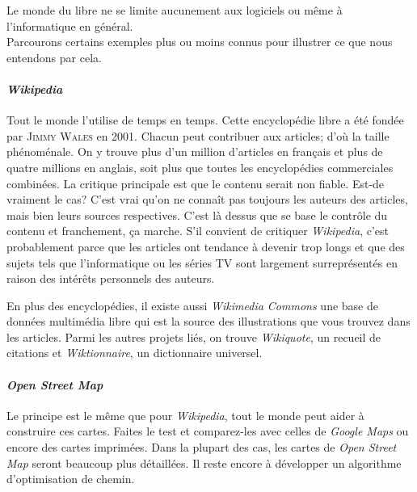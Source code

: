 




\vspace{.6cm}
Le monde du libre ne se limite aucunement aux logiciels ou même à l'informatique en général.\\
Parcourons certains exemples plus ou moins connus pour illustrer ce que nous entendons par cela.

\paragraph{\textit{Wikipedia}}
Tout le monde l'utilise de temps en temps. Cette encyclopédie libre a été fondée par \textsc{Jimmy Wales} en 2001.
Chacun peut contribuer aux articles; d'où la taille phénoménale.
On y trouve plus d'un million d'articles en français et plus de quatre millions en anglais, soit plus que toutes les encyclopédies commerciales combinées.
La critique principale est que le contenu serait non fiable.
Est-de vraiment le cas? C'est vrai qu'on ne connaît pas toujours les auteurs des articles, mais bien leurs sources respectives.
C'est là dessus que se base le contrôle du contenu et franchement, ça marche.
S'il convient de critiquer \textit{Wikipedia}, c'est probablement parce que les articles ont tendance à devenir trop longs et que des sujets tels que l'informatique ou les séries TV
sont largement surreprésentés en raison des intérêts personnels des auteurs.

En plus des encyclopédies, il existe aussi \textit{Wikimedia Commons} une base de données multimédia libre
qui est la source des illustrations que vous trouvez dans les articles.
Parmi les autres projets liés, on trouve \textit{Wikiquote}, un recueil de citations et \textit{Wiktionnaire}, un dictionnaire universel.

\paragraph{\textit{Open Street Map}}
Le principe est le même que pour \textit{Wikipedia}, tout le monde peut aider à construire ces cartes.
Faites le test et comparez-les avec celles de \textit{Google Maps} ou encore des cartes imprimées.
Dans la plupart des cas, les cartes de \textit{Open Street Map} seront beaucoup plus détaillées.
Il reste encore à développer un algorithme d'optimisation de chemin.

